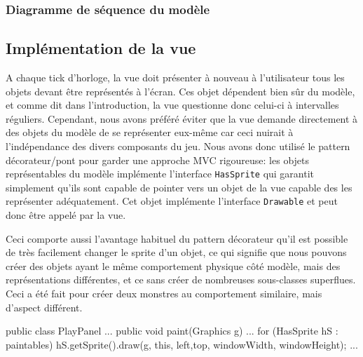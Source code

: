 \documentclass[a4paper, 12pt]{article}
\begin{document}
\subsubsection{Diagramme de séquence du modèle}

\subsection{Implémentation de la vue}

A chaque tick d'horloge, la vue doit présenter à nouveau à l'utilisateur tous les objets devant être représentés à l'écran. Ces objet dépendent bien sûr du modèle, et comme dit dans l'introduction, la vue questionne donc celui-ci à intervalles réguliers. Cependant, nous avons préféré éviter que la vue demande directement à des objets du modèle de se représenter eux-même car ceci nuirait à l'indépendance des divers composants du jeu. Nous avons donc utilisé le pattern décorateur/pont pour garder une approche MVC rigoureuse: les objets représentables du modèle implémente l'interface {\tt HasSprite} qui garantit simplement qu'ils sont capable de pointer vers un objet de la vue capable des les représenter adéquatement. Cet objet implémente l'interface {\tt Drawable} et peut donc être appelé par la vue.

Ceci comporte aussi l'avantage habituel du pattern décorateur qu'il est possible de très facilement changer le sprite d'un objet, ce qui signifie que nous pouvons créer des objets ayant le même comportement physique côté modèle, mais des représentations différentes, et ce sans créer de nombreuses sous-classes superflues. Ceci a été fait pour créer deux monstres au comportement similaire, mais d'aspect différent.

\begin{java}
public class PlayPanel{
  ...
  public void paint(Graphics g){
    ...
    for (HasSprite hS : paintables){
      hS.getSprite().draw(g, this, left,top, windowWidth, windowHeight);
    }
  }
  ...
}
\end{java}

\vspace{1em}
\end{document}
